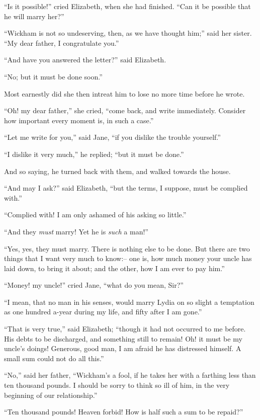 “Is it possible!” cried Elizabeth, when she had
finished. “Can it be possible that he will marry her?”

“Wickham is not so undeserving, then, as we have
th\-ought him;” said her sister. “My dear father, I congratulate
you.”

“And have you answered the letter?” said Elizabeth.

“No; but it must be done soon.”

Most earnestly did she then intreat him to lose no more
time before he wrote.

“Oh! my dear father,” she cried, “come back, and
write immediately. Consider how important every
moment is, in such a case.”

“Let me write for you,” said Jane, “if you dislike the
trouble yourself.”

“I dislike it very much,” he replied; “but it must
be done.”

And so saying, he turned back with them, and walked
towards the house.

“And may I ask?” said Elizabeth, “but the terms,
I suppose, must be complied with.”

“Complied with! I am only ashamed of his asking so
little.”

“And they \textit{must} marry! Yet he is \textit{such} a man!”

“Yes, yes, they must marry. There is nothing else to
be done. But there are two things that I want very much
to know:-- one is, how much money your uncle has laid
down, to bring it about; and the other, how I am ever
to pay him.”

“Money! my uncle!” cried Jane, “what do you
mean, Sir?”

“I mean, that no man in his senses, would marry Lydia
on so slight a temptation as one hundred a-year during
my life, and fifty after I am gone.”

“That is very true,” said Elizabeth; “though it had
not occurred to me before. His debts to be discharged,
and something still to remain! Oh! it must be my
uncle’s doings! Generous, good man, I am afraid he has
distressed himself. A small sum could not do all this.”

“No,” said her father, “Wickham’s a fool, if he
takes her with a farthing less than ten thousand pounds.
I should be sorry to think so ill of him, in the very beginning
of our relationship.”

“Ten thousand pounds! Heaven forbid! How is half
such a sum to be repaid?”

